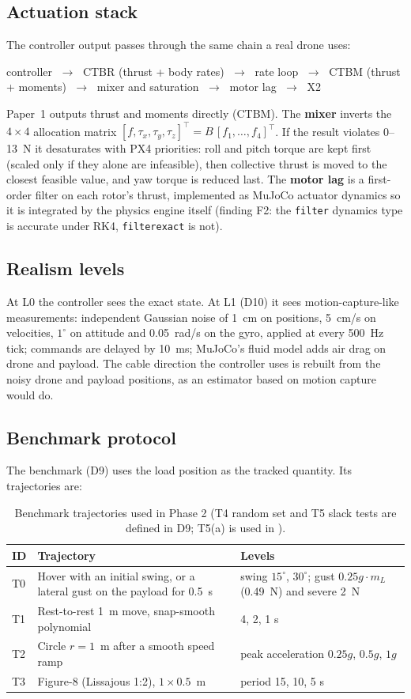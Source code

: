 \documentclass[11pt,a4paper]{article}
\newcommand{\code}[1]{\texttt{\small #1}}
\begin{document}
\subsection{Actuation stack}
The controller output passes through the same chain a real drone uses:
\begin{center}
controller $\;\to\;$ CTBR (thrust + body rates) $\;\to\;$ rate loop $\;\to\;$ CTBM (thrust + moments)
$\;\to\;$ mixer and saturation $\;\to\;$ motor lag $\;\to\;$ X2
\end{center}
Paper~1 outputs thrust and moments directly (CTBM). The \textbf{mixer} inverts the $4\times4$ allocation matrix
$[f,\tau_x,\tau_y,\tau_z]^\top = B\,[f_1,\dots,f_4]^\top$. If the result violates 0--13~N it desaturates with PX4
priorities: roll and pitch torque are kept first (scaled only if they alone are infeasible), then collective thrust is
moved to the closest feasible value, and yaw torque is reduced last. The \textbf{motor lag} is a first-order filter on
each rotor's thrust, implemented as MuJoCo actuator dynamics so it is integrated by the physics engine itself (finding
F2: the \code{filter} dynamics type is accurate under RK4, \code{filterexact} is not).

\subsection{Realism levels}
At L0 the controller sees the exact state. At L1 (D10) it sees motion-capture-like measurements: independent Gaussian
noise of 1~cm on positions, 5~cm/s on velocities, $1^\circ$ on attitude and 0.05~rad/s on the gyro, applied at every
500~Hz tick; commands are delayed by 10~ms; MuJoCo's fluid model adds air drag on drone and payload. The cable direction
the controller uses is rebuilt from the noisy drone and payload positions, as an estimator based on motion capture would
do.

\subsection{Benchmark protocol}
The benchmark (D9) uses the load position as the tracked quantity. Its trajectories are:

\begin{table}[htbp]
\centering\small
\begin{tabularx}{\textwidth}{@{}l X l@{}}
\toprule
ID & Trajectory & Levels \\
\midrule
T0 & Hover with an initial swing, or a lateral gust on the payload for 0.5~s & swing $15^\circ$, $30^\circ$; gust $0.25g\cdot m_L$ (0.49~N) and severe 2~N \\
T1 & Rest-to-rest 1~m move, snap-smooth polynomial & 4, 2, 1 s \\
T2 & Circle $r=1$~m after a smooth speed ramp & peak acceleration $0.25g$, $0.5g$, $1g$ \\
T3 & Figure-8 (Lissajous 1:2), $1\times0.5$~m & period 15, 10, 5 s \\
\bottomrule
\end{tabularx}
\caption{Benchmark trajectories used in Phase 2 (T4 random set and T5 slack tests are defined in D9; T5(a) is used in ).}
\label{tab:traj}
\end{table}
\end{document}
